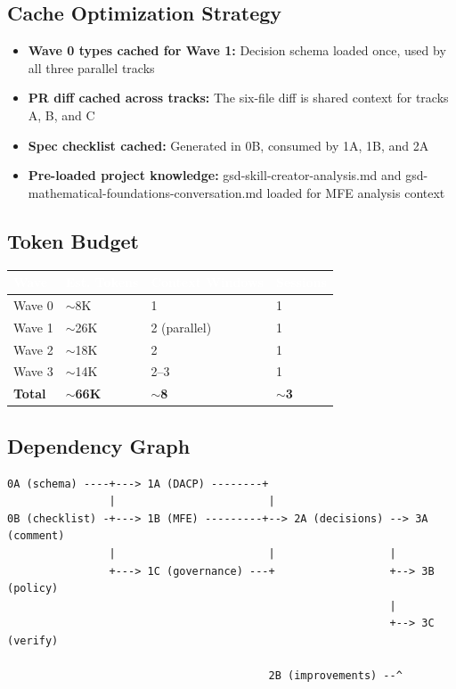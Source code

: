 \documentclass[11pt,letterpaper]{article}
\newcommand{\tableheader}[1]{\textbf{\sffamily\textcolor{white}{#1}}}
\begin{document}
\subsection{Cache Optimization Strategy}

\begin{itemize}[leftmargin=2em]
\item \textbf{Wave 0 types cached for Wave 1:} Decision schema loaded once, used by all three parallel tracks
\item \textbf{PR diff cached across tracks:} The six-file diff is shared context for tracks A, B, and C
\item \textbf{Spec checklist cached:} Generated in 0B, consumed by 1A, 1B, and 2A
\item \textbf{Pre-loaded project knowledge:} gsd-skill-creator-analysis.md and gsd-mathematical-foundations-conversation.md loaded for MFE analysis context
\end{itemize}

\subsection{Token Budget}

\begin{center}
\begin{tabularx}{\textwidth}{L{3cm}C{2cm}C{2.5cm}C{2cm}}
\toprule
{}
\tableheader{Wave} & \tableheader{Est. Tokens} & \tableheader{Context Windows} & \tableheader{Sessions} \\
\midrule
Wave 0 & $\sim$8K & 1 & 1 \\
Wave 1 & $\sim$26K & 2 (parallel) & 1 \\
Wave 2 & $\sim$18K & 2 & 1 \\
Wave 3 & $\sim$14K & 2--3 & 1 \\
\midrule
\textbf{Total} & \textbf{$\sim$66K} & \textbf{$\sim$8} & \textbf{$\sim$3} \\
\bottomrule
\end{tabularx}
\end{center}

\subsection{Dependency Graph}

\begin{asciibox}
\begin{verbatim}
0A (schema) ----+---> 1A (DACP) --------+
                |                        |
0B (checklist) -+---> 1B (MFE) ---------+--> 2A (decisions) --> 3A (comment)
                |                        |                  |
                +---> 1C (governance) ---+                  +--> 3B (policy)
                                                            |
                                                            +--> 3C (verify)

                                         2B (improvements) --^
\end{verbatim}
\end{asciibox}
\end{document}
